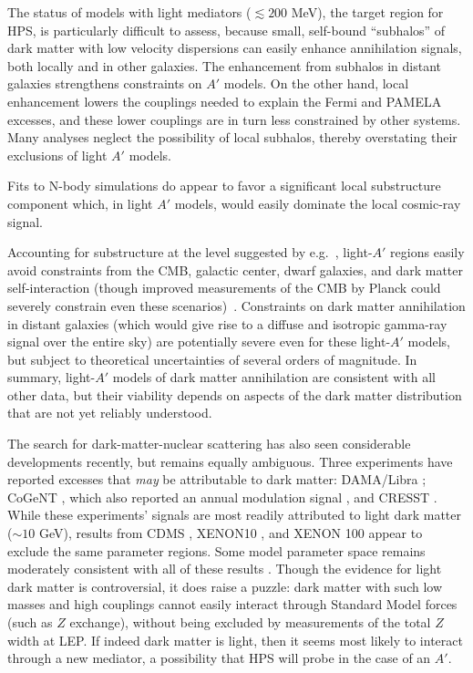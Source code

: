 The status of models with light mediators ($\lesssim 200$ MeV), the target region for HPS, is particularly difficult to assess, because small, self-bound ``subhalos'' of dark matter with low velocity dispersions can easily enhance annihilation signals, both locally and in other galaxies.  The enhancement from subhalos in distant galaxies strengthens constraints on $A'$ models.  On the other hand, local enhancement lowers the couplings needed to explain the Fermi and PAMELA excesses, and these lower couplings are in turn less constrained by other systems.  Many analyses neglect the possibility of local subhalos, thereby overstating their exclusions of light $A'$ models.

Fits to N-body simulations do appear to favor a significant local substructure component \cite{Pieri:2009je,Kistler:2009xf,Kamionkowski:2010mi} which, in light $A'$ models, would easily dominate the local cosmic-ray signal.
	
Accounting for substructure at the level suggested by e.g.~\cite{Kamionkowski:2010mi},  light-$A'$ regions easily avoid constraints from the CMB, galactic center, dwarf galaxies, and dark matter self-interaction (though improved measurements of the CMB by Planck could severely constrain even these scenarios)~\cite{Slatyer:2011kg}.   Constraints on dark matter annihilation in distant galaxies (which would give rise to a diffuse and isotropic gamma-ray signal over the entire sky) are potentially severe even for these light-$A'$ models, but subject to theoretical uncertainties of several orders of magnitude.  In summary, light-$A'$ models of dark matter annihilation are consistent with all other data, but their viability depends on aspects of the dark matter distribution that are not yet reliably understood.

 The search for dark-matter-nuclear scattering has also seen considerable developments recently, but remains equally ambiguous.  Three experiments have reported excesses that \emph{may} be attributable to dark matter: DAMA/Libra \cite{Bernabei:2010mq}; CoGeNT \cite{Aalseth:2010vx}, which also reported an annual modulation signal \cite{Aalseth:2011wp}, and CRESST \cite{Angloher:2011uu}.   While these experiments' signals are most readily attributed to light dark matter ($\sim 10$ GeV), results from CDMS \cite{CDMS}, XENON10 \cite{Angle:2011th}, and XENON 100 \cite{Aprile:2011hi} appear to exclude the same parameter regions.  Some model parameter space remains moderately consistent with all of these results \cite{Kelso:2011gd}.  Though the evidence for light dark matter is controversial, it does raise a puzzle: dark matter with such low masses and high couplings cannot easily interact through Standard Model forces (such as $Z$ exchange), without being excluded by measurements of the total $Z$ width at LEP. If indeed dark matter is light, then it seems most likely to interact through a new mediator, a possibility that HPS will probe in the case of an $A'$.

